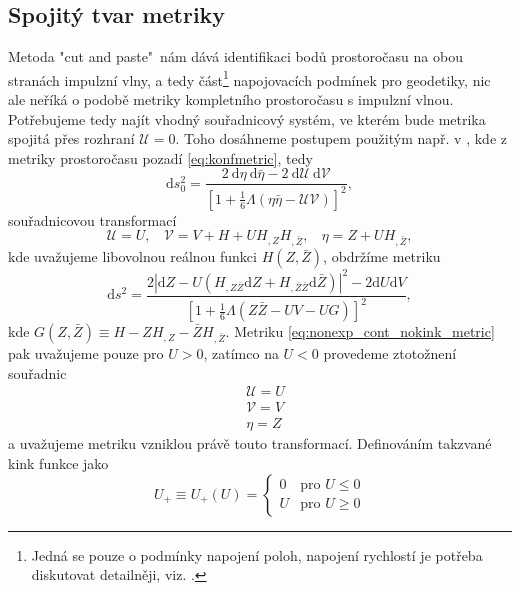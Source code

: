 \subsection{Spojitý tvar metriky}
Metoda "cut and paste"\ nám dává identifikaci bodů prostoročasu na obou stranách impulzní vlny, a tedy část\footnote{Jedná se pouze o podmínky napojení poloh, napojení rychlostí
je potřeba diskutovat detailněji, viz. \cite{Podolsky:2014ysa}.} napojovacích podmínek
pro geodetiky, nic ale neříká o podobě metriky kompletního prostoročasu s impulzní vlnou. Potřebujeme tedy najít vhodný
souřadnicový systém, ve kterém bude metrika spojitá přes rozhraní $\mathcal{U}=0$. Toho dosáhneme postupem použitým např. v
\cite{Podolsky:2014ysa}, kde z metriky prostoročasu pozadí \eqref{eq:konfmetric}, tedy
\begin{equation}
    \label{eq:null_background_metric}
    \mathrm{d}s_0^2 = \frac{2~\mathrm{d}\eta~\mathrm{d}\bar{\eta}-2~\mathrm{d}\mathcal{U}~\mathrm{d}\mathcal{V}}
    {\left[1+\frac{1}{6}\Lambda \left(\eta \bar{\eta}
    -\mathcal{U}\mathcal{V}\right)\right]^2},
\end{equation}
souřadnicovou transformací
\begin{equation}
    \label{eq:nonexp_cont_transform}
    \mathcal{U}=U,~~~~ \mathcal{V}=V+H+UH_{,Z}H_{,\bar{Z}},~~~~ \eta=Z+UH_{,\bar{Z}},
\end{equation}
kde uvažujeme libovolnou reálnou funkci $H(Z, \bar{Z})$, obdržíme metriku
\begin{equation}
    \label{eq:nonexp_cont_nokink_metric}
    \mathrm{d} s^{2}=\frac{2\left|\mathrm{d} Z-U\left(H_{, Z \bar{Z}} 
    \mathrm{d} Z+H_{, \bar{Z} \bar{Z}} \mathrm{d} \bar{Z}\right)\right|^{2}-2 \mathrm{d} U 
    \mathrm{d} V}{\left[1+\frac{1}{6} \Lambda(Z \bar{Z}-U V-U G)\right]^{2}},
\end{equation}
kde $G(Z, \bar{Z}) \equiv H - Z H_{,Z}-\bar{Z}H_{,\bar{Z}}$. Metriku \eqref{eq:nonexp_cont_nokink_metric} pak 
uvažujeme pouze pro $U>0$, zatímco na $U<0$ provedeme ztotožnení souřadnic
\begin{equation}
    \label{eq:transformation_just_rename}
    \begin{split}
        &\mathcal{U} = U \\
        &\mathcal{V} = V \\
        &\eta = Z
    \end{split}
\end{equation}
a uvažujeme metriku vzniklou právě touto transformací.
Definováním
takzvané kink funkce jako
\begin{equation}
    \label{eq:kink_function}
    U_+ \equiv U_+(U) = \begin{cases}
        0 & \text{pro } U \leq 0 \\
        U & \text{pro } U \geq 0
    \end{cases}
\end{equation}
